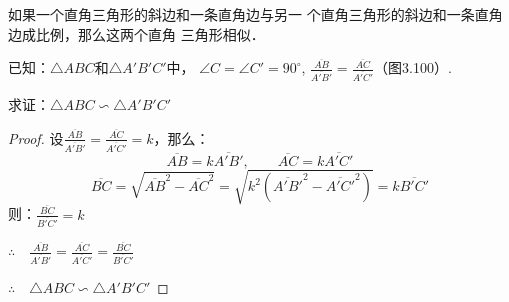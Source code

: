 \begin{example}
    如果一个直角三角形的斜边和一条直角边与另一
个直角三角形的斜边和一条直角边成比例，那么这两个直角
三角形相似．

已知：$\triangle ABC$和$\triangle A'B'C'$中，
$\angle C=\angle C'=90^{\circ}$, $\frac{\overline{AB}}{\overline{A'B'}}=\frac{\overline{AC}}{\overline{A'C'}}$（图3.100）.

求证：$\triangle ABC\backsim \triangle A'B'C'$
\end{example}

\begin{proof}
设$\frac{\overline{AB}}{\overline{A'B'}}=\frac{\overline{AC}}{\overline{A'C'}}=k$，那么：
\[\overline{AB}=k\overline{A'B'},\qquad \overline{AC}=k\overline{A'C'}\]
\[\overline{BC}=\sqrt{\overline{AB}^2-\overline{AC}^2}=\sqrt{k^2\left(\overline{A'B'}^2-\overline{A'C'}^2\right)}=k\overline{B'C'}\]
则：$\frac{\overline{BC}}{\overline{B'C'}}=k$

$\therefore\quad \frac{\overline{AB}}{\overline{A'B'}}=\frac{\overline{AC}}{\overline{A'C'}}=\frac{\overline{BC}}{\overline{B'C'}}$

$\therefore\quad \triangle ABC\backsim \triangle A'B'C'$
\end{proof}

